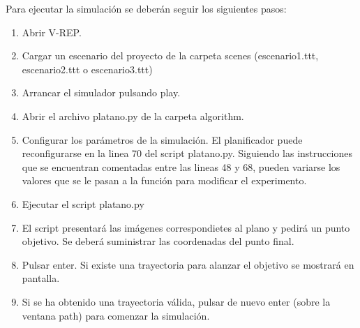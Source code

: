 Para ejecutar la simulación se deberán seguir los siguientes pasos:
\begin{enumerate}
	\item Abrir V-REP.
	\item Cargar un escenario del proyecto de la carpeta scenes (escenario1.ttt, escenario2.ttt o escenario3.ttt)
	\item Arrancar el simulador pulsando play.
	\item Abrir el archivo platano.py de la carpeta algorithm.
	\item Configurar los parámetros de la simulación. El planificador puede reconfigurarse en la linea 70 del script platano.py. Siguiendo las instrucciones que se encuentran comentadas entre las lineas 48 y 68, pueden variarse los valores que se le pasan a la función para modificar el experimento.
	\item Ejecutar el script platano.py
	\item El script presentará las imágenes correspondietes al plano y pedirá un punto objetivo. Se deberá suministrar las coordenadas del punto final.
	\item Pulsar enter. Si existe una trayectoria para alanzar el objetivo se mostrará en pantalla.
	\item Si se ha obtenido una trayectoria válida, pulsar de nuevo enter (sobre la ventana path) para comenzar la simulación.
\end{enumerate}
